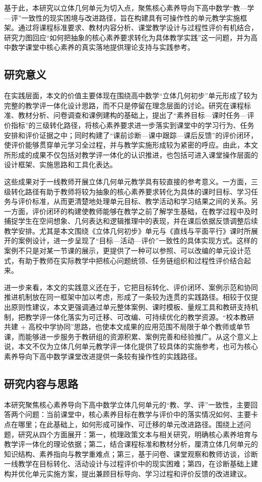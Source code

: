 \documentclass[UTF8,a4paper,12pt,twoside]{ctexart}
\begin{document}
基于此，本研究以立体几何单元为切入点，聚焦核心素养导向下高中数学“教—学—评”一致性的现实困境与改进路径，旨在构建具有可操作性的单元教学实施框架。通过将课程标准要求、教材内容分析、课堂教学设计与过程性评价有机结合，研究力图回应“如何把抽象的核心素养要求转化为具体教学实践”这一问题，并为高中数学课堂中核心素养的真实落地提供理论支持与实践参考。

\subsection{研究意义}
在实践层面，本文的价值主要体现在围绕高中数学“立体几何初步”单元形成了较为完整的教学评一体化设计思路，而不只是停留在理念层面的讨论。研究在课程标准、教材分析、问卷调查和课例建构的基础上，提出了“素养目标—课时任务—评价指标”的三级转化路径，将核心素养要求进一步落实到课堂中的学习行为、任务安排和评价证据之中；同时构建了“课前诊断—课中跟踪—课后反馈”的评价闭环，使评价能够贯穿单元学习全过程，并与教学实施形成较为紧密的呼应。由此，本文所形成的成果不仅包括对教学评一体化的认识推进，也包括可进入课堂操作层面的设计框架、实施思路和工具化表达。

这些成果对于一线教师开展立体几何单元教学具有较直接的参考意义。一方面，三级转化路径有助于教师将较为抽象的核心素养要求转化为具体的课时目标、学习任务与评价标准，从而更清楚地处理单元目标、教学活动和学习结果之间的关系。另一方面，评价闭环的构建使教师能够在教学之前了解学生基础，在教学过程中及时捕捉学生在空间想象、几何表达和逻辑推理中的表现，并在课后依据反馈调整后续教学安排。尤其是本文围绕《立体几何初步》单元与《直线与平面平行》课时所展开的案例设计，进一步呈现了“目标—活动—评价”一致性的具体实现方式。这样的案例不只是对某一节课的展示，更提供了一种可以参照、可以改编的单元设计范式，有助于教师在实际教学中把核心问题统领、任务链组织和过程性评价结合起来。

进一步来看，本文的实践意义还在于，它把目标转化、评价闭环、案例示范和协同推进机制放在同一框架中加以考虑，形成了一条较为连贯的实践路径。相较于仅提出原则性建议，本文更强调通过单元整体案例、课时模板、量规工具和教研支持机制，把教学评一体化落实为可迁移、可改编、可持续优化的教学资源。“校本教研共建 + 高校中学协同”思路，也使本文成果的应用范围不局限于单个教师或单节课，而能够进一步服务于教研组的资源积累、案例完善和经验推广。从这个意义上说，本文不仅为立体几何单元教学评一体化提供了较具体的实施参考，也可为核心素养导向下高中数学课堂改进提供一条较有操作性的实践路径。

\subsection{研究内容与思路}
本研究聚焦核心素养导向下高中数学立体几何单元的“教、学、评”一致性，主要回答两个问题：当前课堂中，核心素养目标在教学与评价中的落实情况如何、主要卡点在哪里；在此基础上，如何形成可操作、可迁移的单元改进路径。围绕上述问题，研究从四个方面展开：第一，梳理政策文本与相关研究，明确核心素养培育与教学评一体化的理论依据；第二，结合课程标准和教材分析，厘清立体几何单元的知识结构、素养指向与教学重难点；第三，基于问卷、课堂观察和教师访谈，诊断一线教学在目标转化、活动设计与过程评价中的现实困难；第四，在诊断基础上建构并优化单元实施方案，提出兼顾目标导向、学习过程和评价反馈的改进建议。
\end{document}
